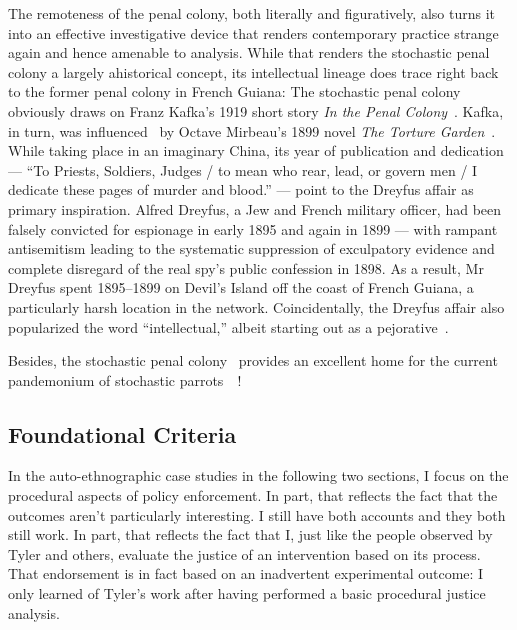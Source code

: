 The remoteness of the penal colony, both literally and figuratively, also turns
it into an effective investigative device that renders contemporary practice
strange again and hence amenable to analysis. While that renders the stochastic
penal colony a largely ahistorical concept, its intellectual lineage does trace
right back to the former penal colony in French Guiana: The stochastic penal
colony obviously draws on Franz Kafka's 1919 short story \emph{In the Penal
Colony}~\cite{Kafka1995}. Kafka, in turn, was influenced~\cite{Robertson2017} by
Octave Mirbeau's 1899 novel \emph{The Torture Garden}~\cite{Mirbeau2008}. While
taking place in an imaginary China, its year of publication and dedication ---
``To Priests, Soldiers, Judges / to mean who rear, lead, or govern men / I
dedicate these pages of murder and blood.'' --- point to the Dreyfus affair as
primary inspiration. Alfred Dreyfus, a Jew and French military officer, had been
falsely convicted for espionage in early 1895 and again in 1899 --- with rampant
antisemitism leading to the systematic suppression of exculpatory evidence and
complete disregard of the real spy's public confession in 1898. As a result, Mr
Dreyfus spent 1895--1899 on Devil's Island off the coast of French Guiana, a
particularly harsh location in the network. Coincidentally, the Dreyfus affair
also popularized the word ``intellectual,'' albeit starting out as a
pejorative~\cite{Drake2005,StudentsAtTheUniversityOfBristol2021}.

Besides, the stochastic penal colony~ provides an excellent
home for the current pandemonium of stochastic
parrots~~\cite{BenderGebruea2021}!


\subsection{Foundational Criteria}
\label{sec:criteria}

In the auto-ethnographic case studies in the following two sections, I focus on
the procedural aspects of policy enforcement. In part, that reflects the fact
that the outcomes aren't particularly interesting. I still have both accounts
and they both still work. In part, that reflects the fact that I, just like the
people observed by Tyler and others, evaluate the justice of an intervention
based on its process. That endorsement is in fact based on an inadvertent
experimental outcome: I only learned of Tyler's work after having performed a
basic procedural justice analysis.


